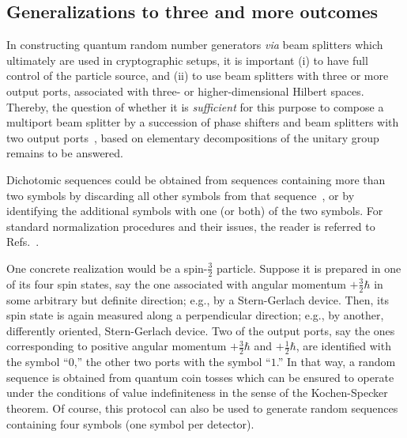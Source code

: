\documentclass[%
 preprint,
 showpacs,
 showkeys,
 preprintnumbers,
 amsmath,amssymb,
 aps,
 pra,
  longbibliography,
 ]{revtex4-1}
\begin{document}
\subsection{Generalizations to three and more outcomes}

In constructing quantum random number generators {\em via} beam splitters
which ultimately are used in cryptographic setups, it is important
(i)  to have full control of the particle source, and
(ii) to use beam splitters with three or more output ports,
associated with three- or higher-dimensional Hilbert spaces.
Thereby, the question of whether it is {\em sufficient} for this purpose to compose a multiport beam splitter
by a succession of phase shifters and beam splitters
with two output ports~\cite{rzbb,svozil-2004-analog},
based on elementary decompositions of the unitary group~\cite{murnaghan} remains to be answered.

Dichotomic sequences could be obtained from sequences containing more than two symbols
by discarding all other symbols from that sequence~\cite{MR997340},
or by identifying the additional symbols with one (or both) of the two symbols.
For standard normalization procedures and their issues,
the reader is referred to Refs.~\cite{von-neumann1,Samuelson-1968,elias-72,PeresY-1992,dichtl-2007,Lacharme-2008}.

One concrete realization would be a spin-$\frac{3}{2}$ particle. Suppose it is prepared
in one of its four spin states, say the one associated with angular momentum $+\frac{3}{2}\hbar$ in
some arbitrary but definite direction; e.g., by a Stern-Gerlach device.
Then, its  spin state is  again measured along a perpendicular direction;
e.g., by another, differently oriented, Stern-Gerlach device.
Two of the output ports, say the ones corresponding to positive angular momentum $+\frac{3}{2}\hbar$
and $+\frac{1}{2}\hbar$,
are identified with the symbol ``$0$,'' the other two ports with the symbol ``$1$.''
In that way, a random sequence is obtained from quantum coin tosses
which can be ensured to operate under the conditions of value indefiniteness
in the sense of the Kochen-Specker theorem.
Of course, this protocol can also be used to generate random sequences
containing four symbols (one symbol per detector).
\end{document}
